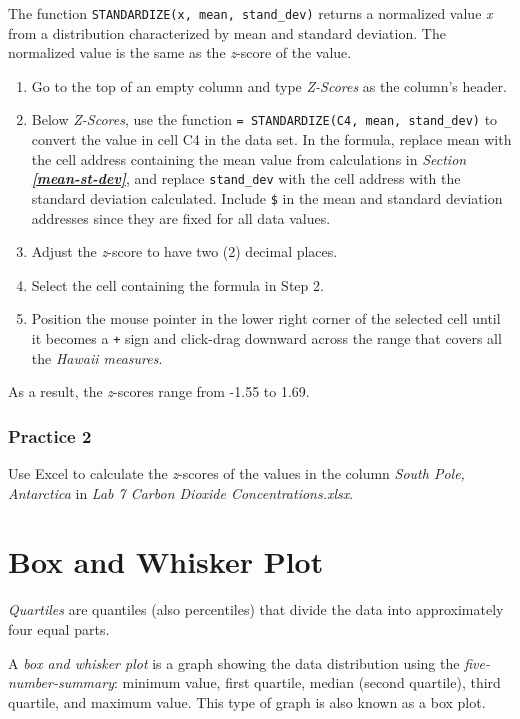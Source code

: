 \documentclass[
]{book}
\providecommand{\tightlist}{%
  \setlength{\itemsep}{0pt}\setlength{\parskip}{0pt}}
\begin{document}
The function \texttt{STANDARDIZE(x,\ mean,\ stand\_dev)} returns a normalized value \emph{x} from a distribution characterized by mean and standard deviation. The normalized value is the same as the \emph{z}-score of the value.

\begin{enumerate}
\def\labelenumi{\arabic{enumi}.}
\tightlist
\item
  Go to the top of an empty column and type \emph{Z-Scores} as the column's header.
\item
  Below \emph{Z-Scores}, use the function \texttt{=\ STANDARDIZE(C4,\ mean,\ stand\_dev)} to convert the value in cell C4 in the data set. In the formula, replace mean with the cell address containing the mean value from calculations in \emph{Section} \textbf{\emph{\ref{mean-st-dev}}}, and replace \texttt{stand\_dev} with the cell address with the standard deviation calculated. Include \texttt{\$} in the mean and standard deviation addresses since they are fixed for all data values.
\item
  Adjust the \emph{z}-score to have two (2) decimal places.
\item
  Select the cell containing the formula in Step 2.
\item
  Position the mouse pointer in the lower right corner of the selected cell until it becomes a \texttt{+} sign and click-drag downward across the range that covers all the \emph{Hawaii measures}.
\end{enumerate}

As a result, the \emph{z}-scores range from -1.55 to 1.69.

\hypertarget{practice-2-5}{%
\subsection{Practice 2}\label{practice-2-5}}

Use Excel to calculate the \emph{z}-scores of the values in the column \emph{South Pole, Antarctica} in \emph{Lab 7 Carbon Dioxide Concentrations.xlsx}.

\hypertarget{box-and-whisker-plot}{%
\chapter{Box and Whisker Plot}\label{box-and-whisker-plot}}

\emph{Quartiles} are quantiles (also percentiles) that divide the data into approximately four equal parts.

A \emph{box and whisker plot} is a graph showing the data distribution using the \emph{five-number-summary}: minimum value, first quartile, median (second quartile), third quartile, and maximum value. This type of graph is also known as a box plot.
\end{document}
